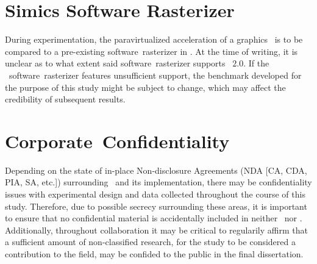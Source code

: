 
\section{Simics Software Rasterizer}
\label{sec:risksandliabilities_simicssoftwarerasterizer}
During experimentation, the paravirtualized acceleration of a graphics \termapi\ is to be compared to a pre-existing software~rasterizer in \termsimics .
At the time of writing, it is unclear as to what extent said software~rasterizer supports \termopengles ~$2.0$.
If the \termsimics\ software~rasterizer features unsufficient support, the benchmark developed for the purpose of this study might be subject to change, which may affect the credibility of subsequent results.



\section{Corporate~Confidentiality}
\label{sec:risksandliabilities_corporateconfidentiality}
Depending on the state of in-place Non-disclosure Agreements (NDA [CA, CDA, PIA, SA, etc.]) surrounding \termsimics\ and its implementation, there may be confidentiality issues with experimental design and data collected throughout the course of this study.
Therefore, due to possible secrecy surrounding these areas, it is important to ensure that no confidential material is accidentally included in neither \termproposal\ nor \termthesis .
Additionally, throughout collaboration it may be critical to regularily affirm that a sufficient amount of non-classified research, for the study to be considered a contribution to the field, may be confided to the public in the final dissertation.


